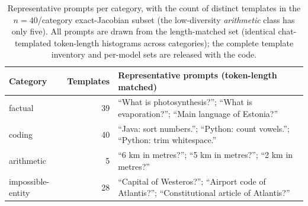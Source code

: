 \documentclass{article}
\begin{document}
\begin{table}[h]\centering\small
\begin{tabular}{@{}l r p{8.7cm}@{}}
\toprule
Category & Templates & Representative prompts (token-length matched) \\
\midrule
factual             & 39 & ``What is photosynthesis?'';\; ``What is evaporation?'';\; ``Main language of Estonia?'' \\
coding              & 40 & ``Java: sort numbers.'';\; ``Python: count vowels.'';\; ``Python: trim whitespace.'' \\
arithmetic           &  5 & ``6 km in metres?'';\; ``5 km in metres?'';\; ``2 km in metres?'' \\
impossible-entity & 28 & ``Capital of Westeros?'';\; ``Airport code of Atlantis?'';\; ``Constitutional article of Atlantis?'' \\
\bottomrule
\end{tabular}
\caption{Representative prompts per category, with the count of distinct templates in the
$n{=}40$/category exact-Jacobian subset (the low-diversity \emph{arithmetic} class has only five). All
prompts are drawn from the length-matched set (identical chat-templated token-length histograms across
categories); the complete template inventory and per-model sets are released with the code.}
\label{tab:prompt-examples}
\end{table}
\end{document}
